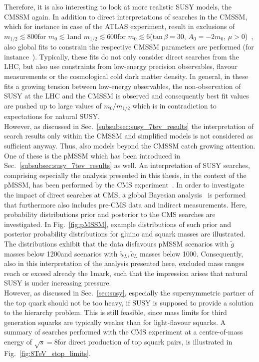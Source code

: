 Therefore, it is also interesting to look at more realistic SUSY models, \eg the CMSSM again. In addition to direct interpretations of searches in the CMSSM, which for instance in case of the ATLAS experiment, result in exclusions of $m_{1/2} \lesssim 800$\gev for $m_{0} \lesssim 1$\tev and $m_{1/2} \lesssim 600$\gev for $m_{0} \lesssim 6$\tev ($\mathrm{tan} \, \beta = 30$, $A_0 = -2m_0$, $\mu >0$)~\cite{bib:ATLAS:PhysicsResultsSUS}, also global fits to constrain the respective CMSSM parameters are performed (\cf for instance~\cite{Bechtle:2012zk, Buchmueller:2013rsa}). Typically, these fits do not only consider direct searches from the LHC, but also use constraints from low-energy precision observables, flavour measurements or the cosmological cold dark matter density. In general, in these fits a growing tension between low-energy observables, the non-observation of SUSY at the LHC and the CMSSM is observed and consequently best fit values are pushed up to large values of $m_0/m_{1/2}$ which is in contradiction to expectations for natural SUSY. \\
However, as discussed in Sec.~\ref{subsubsec:susy_7tev_results} the interpretation of search results only within the CMSSM and simplified models is not considered as sufficient anyway. Thus, also models beyond the CMSSM catch growing attention. One of these is the pMSSM which has been introduced in Sec.~\ref{subsubsec:susy_7tev_results} as well. An interpretation of SUSY searches, comprising especially the analysis presented in this thesis, in the context of the pMSSM, has been performed by the CMS experiment~\cite{CMS-PAS-SUS-13-020}. In order to investigate the impact of direct searches at CMS, a global Bayesian analysis~\cite{robert2001bayesian, o2004bayesian} is performed that furthermore also includes pre-CMS data and indirect measurements. Here, probability distributions prior and posterior to the CMS searches are investigated. In Fig.~\ref{fig:pMSSM}, example distributions of such prior and posterior probability distributions for gluino and squark masses are illustrated. The distributions exhibit that the data disfavours pMSSM scenarios with $\tilde{g}$ masses below 1200\gev and scenarios with $\tilde{u}_L,\tilde{c}_L$ masses below 1000\gev. Consequently, also in this interpretation of the analysis presented here, excluded mass ranges reach or exceed already the 1\tev mark, such that the impression arises that natural SUSY is under increasing pressure. \\
However, as discussed in Sec.~\ref{sec:susy}, especially the supersymmetric partner of the top quark should not be too heavy, if SUSY is supposed to provide a solution to the hierarchy problem. This is still feasible, since mass limits for third generation squarks are typically weaker than for light-flavour squarks. A summary of searches performed with the CMS experiment at a centre-of-mass energy of $\sqrt{s} = 8$\tev for direct production of top squark pairs, is illustrated in Fig.~\ref{fig:8TeV_stop_limits}.
